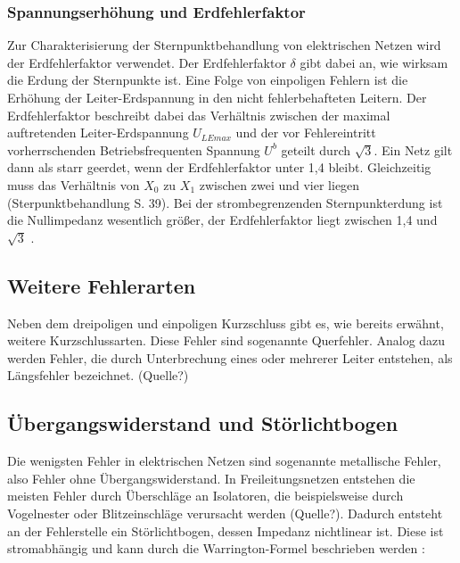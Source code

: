 \documentclass{scrartcl}
\begin{document}
\begin{onehalfspace}
\subsubsection{Spannungserhöhung und Erdfehlerfaktor}
Zur Charakterisierung der Sternpunktbehandlung von elektrischen Netzen wird der Erdfehlerfaktor verwendet. Der Erdfehlerfaktor $\delta$ gibt dabei an, wie wirksam die Erdung der Sternpunkte ist. Eine Folge von einpoligen Fehlern ist die Erhöhung der Leiter-Erdspannung in den nicht fehlerbehafteten Leitern. Der Erdfehlerfaktor beschreibt dabei das Verhältnis zwischen der maximal auftretenden Leiter-Erdspannung $U_{LEmax}$ und der vor Fehlereintritt vorherrschenden Betriebsfrequenten Spannung $U^b$ geteilt durch $\sqrt{3}$. Ein Netz gilt dann als \glqq starr geerdet\grqq, wenn der Erdfehlerfaktor unter 1,4 bleibt. Gleichzeitig muss das Verhältnis von $X_0$ zu $X_1$ zwischen zwei und vier liegen (Sterpunktbehandlung S. 39). Bei der strombegrenzenden Sternpunkterdung ist die Nullimpedanz wesentlich größer, der Erdfehlerfaktor liegt zwischen 1,4 und $\sqrt{3}$ \cite[S. 33 ff]{Schlabbach2002}.

\subsection{Weitere Fehlerarten}
Neben dem dreipoligen und einpoligen Kurzschluss gibt es, wie bereits erwähnt, weitere Kurzschlussarten. Diese Fehler sind sogenannte \glqq Querfehler\grqq{}. Analog dazu werden Fehler, die durch Unterbrechung eines oder mehrerer Leiter entstehen, als \glqq Längsfehler\grqq{} bezeichnet. (Quelle?)

\subsection{Übergangswiderstand und Störlichtbogen}
Die wenigsten Fehler in elektrischen Netzen sind sogenannte \glqq metallische Fehler\grqq, also Fehler ohne Übergangswiderstand. In Freileitungsnetzen entstehen die meisten Fehler durch Überschläge an Isolatoren, die beispielsweise durch Vogelnester oder Blitzeinschläge verursacht werden (Quelle?). Dadurch entsteht an der Fehlerstelle ein Störlichtbogen, dessen Impedanz nichtlinear ist. Diese ist stromabhängig und kann durch die Warrington-Formel beschrieben werden \cite[S. 163]{Ziegler2008}: \\


\end{onehalfspace}
\end{document}
